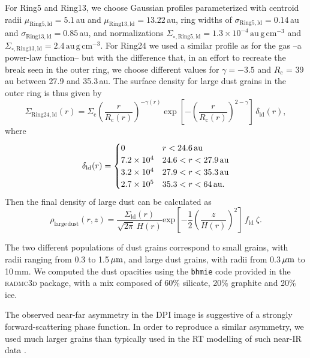 \documentclass[fleqn,usenatbib,useAMS]{mnras}
\begin{document}
For Ring5 and Ring13, we choose Gaussian profiles parameterized with centroid radii $\mu_{\mathrm{Ring5, ld}}=5.1$\,au and $\mu_{\mathrm{Ring13, ld}}=13.22$\,au, ring widths of $\sigma_{\mathrm{Ring5,ld}}=0.14$\,au and $\sigma_{\mathrm{Ring13,ld}}=0.85$\,au, and normalizations $\Sigma_{\circ,\mathrm{Ring5,ld}}=1.3\times10^{-4}\,\mathrm{au\,g\,cm^{-3}}$ and $\Sigma_{\circ,\mathrm{Ring13,ld}}=2.4\,\mathrm{au\,g\,cm^{-3}}$. For Ring24 we used a similar profile as for the gas --a power-law function-- but with the difference that, in an effort to recreate the break seen in the outer ring, we choose different values for $\gamma = -3.5$ and $R_c$ = 39\,au between 27.9 and 35.3\,au. The surface density for large dust grains in the outer ring is thus given by
\begin{equation}
    \Sigma_{\mathrm{Ring24,ld}}(r) = \Sigma_{\mathrm{c}} \left(\frac{r}{R_{\mathrm{c}}(r)}\right)^{-\gamma(r)} \exp\left[-\left(\frac{r}{R_{\mathrm{c}}(r)}\right)^{2-\gamma}\right]\,\delta_{\mathrm{ld}}(r),
\end{equation}
where
\begin{equation}
  \delta_{\mathrm{ld}}(r) =
  \begin{cases}
  0                 & r < 24.6\text{\,au} \\
  7.2 \times10^{4} & 24.6 < r < 27.9\text{\,au} \\
  3.2 \times10^{4} & 27.9 < r < 35.3\text{\,au} \\
  2.7 \times10^{5} & 35.3 < r < 64\text{\,au.} \\
  \end{cases}
\end{equation}
Then the final density of large dust can be calculated as
\begin{equation}
\rho_{\mathrm{large\,dust}}(r,z)=
\frac{\Sigma_{\mathrm{ld}}(r)}{\sqrt{2\pi} \, H(r)} \mathrm{exp}\left[-\frac{1}{2} \left(\frac{z}{H(r)}\right)^2\right] \, f_{\mathrm{ld}} \: \zeta .
\end{equation}

The two different populations of dust grains correspond to small grains, with radii ranging from 0.3 to 1.5\,$\hbox{$\mu$m}$, and large dust grains, with radii from 0.3\,$\hbox{$\mu$m}$ to 10\,mm. We computed the dust opacities using the {\tt bhmie} code provided in the \textsc{radmc3d} package, with a mix composed of 60\% silicate, 20\% graphite and 20\% ice. 

The observed near-far asymmetry in the DPI image is suggestive of a strongly forward-scattering phase function. In order to reproduce a similar asymmetry, we used much larger grains than typically used in the RT modelling of such near-IR data \citep[e.g.,][]{2018MNRAS.477.5104C}. 
\end{document}
